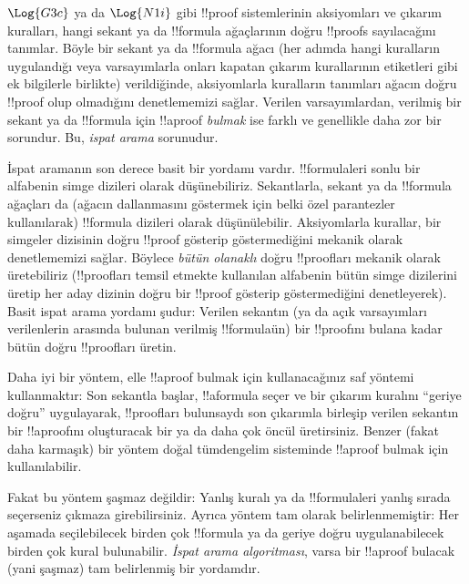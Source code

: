 



$\Log{G3c}$ ya da $\Log{N1i}$ gibi !!{proof} sistemlerinin aksiyomları ve
çıkarım kuralları, hangi sekant ya da !!{formula} ağaçlarının doğru
!!{proof}s sayılacağını tanımlar. Böyle bir sekant ya da !!{formula} ağacı
(her adımda hangi kuralların uygulandığı veya varsayımlarla onları kapatan
çıkarım kurallarının etiketleri gibi ek bilgilerle birlikte) verildiğinde,
aksiyomlarla kuralların tanımları ağacın doğru !!{proof} olup olmadığını
denetlememizi sağlar. Verilen varsayımlardan, verilmiş bir sekant ya da
!!{formula} için !!a{proof} \emph{bulmak} ise farklı ve genellikle daha zor
bir sorundur. Bu, \emph{ispat arama} sorunudur.

İspat aramanın son derece basit bir yordamı vardır. !!{formula}{}leri sonlu bir
alfabenin simge dizileri olarak düşünebiliriz. Sekantlarla, sekant ya da
!!{formula} ağaçları da (ağacın dallanmasını göstermek için belki özel
parantezler kullanılarak) !!{formula} dizileri olarak düşünülebilir.
Aksiyomlarla kurallar, bir simgeler dizisinin doğru !!{proof} gösterip
göstermediğini mekanik olarak denetlememizi sağlar. Böylece \emph{bütün
olanaklı} doğru !!{proof}{}ları mekanik olarak üretebiliriz (!!{proof}{}ları temsil
etmekte kullanılan alfabenin bütün simge dizilerini üretip her aday dizinin
doğru bir !!{proof} gösterip göstermediğini denetleyerek). Basit ispat arama
yordamı şudur: Verilen sekantın (ya da açık varsayımları verilenlerin
arasında bulunan verilmiş !!{formula}{}ün) bir !!{proof}{}ını bulana kadar bütün
doğru !!{proof}{}ları üretin.

Daha iyi bir yöntem, elle !!a{proof} bulmak için kullanacağınız saf yöntemi
kullanmaktır: Son sekantla başlar, !!a{formula} seçer ve bir çıkarım kuralını
``geriye doğru'' uygulayarak, !!{proof}{}ları bulunsaydı son çıkarımla birleşip
verilen sekantın bir !!a{proof}{}ını oluşturacak bir ya da daha çok öncül
üretirsiniz. Benzer (fakat daha karmaşık) bir yöntem doğal tümdengelim
sisteminde !!a{proof} bulmak için kullanılabilir.

Fakat bu yöntem şaşmaz değildir: Yanlış kuralı ya da !!{formula}{}leri yanlış
sırada seçerseniz çıkmaza girebilirsiniz. Ayrıca yöntem tam olarak
belirlenmemiştir: Her aşamada seçilebilecek birden çok !!{formula} ya da
geriye doğru uygulanabilecek birden çok kural bulunabilir. \emph{İspat arama
algoritması}, varsa bir !!a{proof} bulacak (yani şaşmaz) tam belirlenmiş bir
yordamdır.

